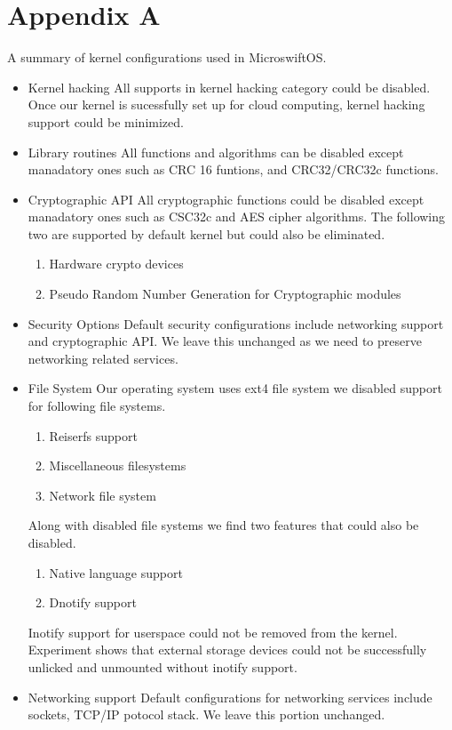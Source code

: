 \section{Appendix A}
A summary of kernel configurations used in MicroswiftOS.
\begin{itemize}
\item
Kernel hacking
	All supports in kernel hacking category could be disabled. Once our kernel is sucessfully set up for cloud computing, kernel hacking support could be minimized.
\item
Library routines
	All functions and algorithms can be disabled except manadatory ones such as CRC 16 funtions, and CRC32/CRC32c functions.
\item
Cryptographic API
	All cryptographic functions could be disabled except manadatory ones such as CSC32c and AES cipher algorithms. The following two are supported by default kernel but could also be eliminated.
\begin{enumerate}
\item
Hardware crypto devices
\item
Pseudo Random Number Generation for Cryptographic modules
\end{enumerate}
\item
Security Options
	Default security configurations include networking support and cryptographic API. We leave this unchanged as we need to preserve networking related services.
\item
File System
	Our operating system uses ext4 file system we disabled support for following file systems.
\begin{enumerate}
\item
Reiserfs support
\item
Miscellaneous filesystems
\item
Network file system
\end{enumerate}
Along with disabled file systems we find two features that could also be disabled.
\begin{enumerate}
\item
Native language support
\item
Dnotify support
\end{enumerate}
Inotify support for userspace could not be removed from the kernel. Experiment shows that external storage devices could not be successfully unlicked and unmounted without inotify support.
\item
Networking support
	Default configurations for networking services include sockets, TCP/IP potocol stack. We leave this portion unchanged.

\end{itemize}
